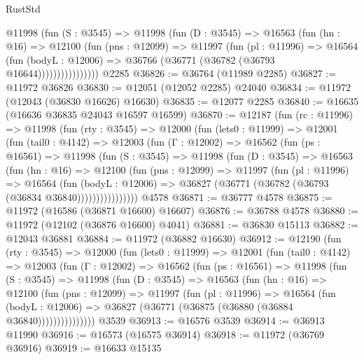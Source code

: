 \begin{lexlean}{RustStd}
\begin{coremodule}
                @11998
                  (fun (S : @3545) =>
                  @11998
                    (fun (D : @3545) =>
                    @16563
                      (fun (hn : @16) =>
                      @12100
                        (fun (pns : @12099) =>
                        @11997
                          (fun (pl : @11996) =>
                          @16564
                            (fun (bodyL : @12006) =>
                            @36766 (@36771 (@36782 (@36793 @16644))))))))))))))))
    @2285
@36826 := @36764 (@11989 @2285)
@36827 := @11972 @36826
@36830 := @12051 (@12052 @2285) @24040
@36834 := @11972 (@12043 (@36830 @16626) @16630)
@36835 := @12077 @2285
@36840 := @16635 (@16636 @36835 @24043 @16597 @16599)
@36870 := @12187
    (fun (rc : @11996) =>
    @11998
      (fun (rty : @3545) =>
      @12000
        (fun (lets0 : @11999) =>
        @12001
          (fun (tail0 : @4142) =>
          @12003
            (fun (Γ : @12002) =>
            @16562
              (fun (ps : @16561) =>
              @11998
                (fun (S : @3545) =>
                @11998
                  (fun (D : @3545) =>
                  @16563
                    (fun (hn : @16) =>
                    @12100
                      (fun (pns : @12099) =>
                      @11997
                        (fun (pl : @11996) =>
                        @16564
                          (fun (bodyL : @12006) =>
                          @36827 (@36771 (@36782 (@36793 (@36834 @36840))))))))))))))))
    @4578
@36871 := @36777 @4578
@36875 := @11972 (@16586 (@36871 @16600) @16607)
@36876 := @36788 @4578
@36880 := @11972 (@12102 (@36876 @16600) @4041)
@36881 := @36830 @15113
@36882 := @12043 @36881
@36884 := @11972 (@36882 @16630)
@36912 := @12190
    (fun (rty : @3545) =>
    @12000
      (fun (lets0 : @11999) =>
      @12001
        (fun (tail0 : @4142) =>
        @12003
          (fun (Γ : @12002) =>
          @16562
            (fun (ps : @16561) =>
            @11998
              (fun (S : @3545) =>
              @11998
                (fun (D : @3545) =>
                @16563
                  (fun (hn : @16) =>
                  @12100
                    (fun (pns : @12099) =>
                    @11997
                      (fun (pl : @11996) =>
                      @16564
                        (fun (bodyL : @12006) =>
                        @36827 (@36771 (@36875 (@36880 (@36884 @36840)))))))))))))))
    @3539
@36913 := @16576 @3539
@36914 := @36913 @11990
@36916 := @16573 (@16575 @36914)
@36918 := @11972 (@36769 @36916)
@36919 := @16633 @15135

\end{coremodule}
\end{lexlean}
